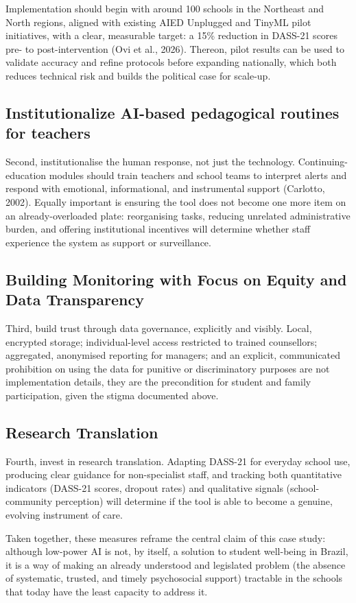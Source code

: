 \documentclass[
  12pt,
  openright,
  oneside,
  a4paper,
  english,
  brazil
]{abntex2}
\begin{document}
Implementation should begin with around 100 schools in the Northeast and North
regions, aligned with existing AIED Unplugged and TinyML pilot initiatives, with
a clear, measurable target: a 15\% reduction in DASS-21 scores pre- to
post-intervention (Ovi et al., 2026). Thereon, pilot results can be used to
validate accuracy and refine protocols before expanding nationally, which both
reduces technical risk and builds the political case for scale-up.

\subsection{Institutionalize AI-based pedagogical routines for teachers}

Second, institutionalise the human response, not just the technology.
Continuing-education modules should train teachers and school teams to interpret
alerts and respond with emotional, informational, and instrumental support
(Carlotto, 2002). Equally important is ensuring the tool does not become one
more item on an already-overloaded plate: reorganising tasks, reducing unrelated
administrative burden, and offering institutional incentives will determine
whether staff experience the system as support or surveillance.

\subsection{Building Monitoring with Focus on Equity and Data Transparency}

Third, build trust through data governance, explicitly and visibly. Local,
encrypted storage; individual-level access restricted to trained counsellors;
aggregated, anonymised reporting for managers; and an explicit, communicated
prohibition on using the data for punitive or discriminatory purposes are not
implementation details, they are the precondition for student and family
participation, given the stigma documented above.

\subsection{Research Translation}

Fourth, invest in research translation. Adapting DASS-21 for everyday school
use, producing clear guidance for non-specialist staff, and tracking both
quantitative indicators (DASS-21 scores, dropout rates) and qualitative signals
(school-community perception) will determine if the tool is able to become a
genuine, evolving instrument of care.

Taken together, these measures reframe the central claim of this case study:
although low-power AI is not, by itself, a solution to student well-being in
Brazil, it is a way of making an already understood and legislated problem (the
absence of systematic, trusted, and timely psychosocial support) tractable in
the schools that today have the least capacity to address it.

\fi
\end{document}
